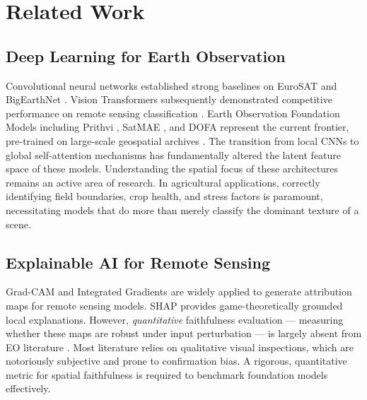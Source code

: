 \documentclass[10pt,journal]{IEEEtran}
\begin{document}
\section{Related Work}

\subsection{Deep Learning for Earth Observation}
Convolutional neural networks established strong baselines on EuroSAT
\cite{helber2019eurosat} and BigEarthNet \cite{sumbul2019bigearthnet}.
Vision Transformers \cite{dosovitskiy2021vit} subsequently demonstrated
competitive performance on remote sensing classification \cite{wang2022fm_rs_survey, tuia2023fm_survey}. Earth Observation
Foundation Models including Prithvi \cite{jakubik2024prithvi}, SatMAE
\cite{cong2022satmae}, and DOFA \cite{xiong2024dofa} represent the
current frontier, pre-trained on large-scale geospatial archives \cite{reed2023scalemae, wang2022ringmo, mendieta2023geofm, oquab2024dinov2, wang2024ssl4eo, fuller2024croma, astruc2024anysat, klemmer2024xairs, ghosh2024trustrs, smith2025evaluating, kerner2024fields, hong2024spectralgpt, clay2024, liu2024remoteclip}.
The transition from local CNNs to global self-attention mechanisms has fundamentally altered the latent feature space of these models. Understanding the spatial focus of these architectures remains an active area of research. In agricultural applications, correctly identifying field boundaries, crop health, and stress factors is paramount, necessitating models that do more than merely classify the dominant texture of a scene.

\subsection{Explainable AI for Remote Sensing}
Grad-CAM \cite{selvaraju2017gradcam} and Integrated Gradients
\cite{sundararajan2017ig} are widely applied to generate attribution maps
for remote sensing models. SHAP \cite{lundberg2017shap} provides
game-theoretically grounded local explanations. However, \emph{quantitative}
faithfulness evaluation --- measuring whether these maps are robust under
input perturbation --- is largely absent from EO literature
\cite{samek2021explaining}. Most literature relies on qualitative visual inspections, which are notoriously subjective and prone to confirmation bias. A rigorous, quantitative metric for spatial faithfulness is required to benchmark foundation models effectively.
\end{document}
